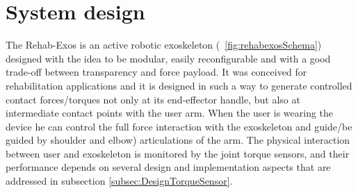 \section{System design} \label{sec:systemDesign}
\begin{figure*}[htb]
	\centering
	\def\svgwidth{2\columnwidth}
	\begin{footnotesize}
		
	\end{footnotesize}
	\caption{(a) The Rehab-Exos. It is a 5 DOF upper-limb exoskeleton  with 4 actuated joints. The joints $J_1$, $J_2$ and $J_4$ share the same characteristics: high reduction ratio (100:1) by means of harmonic drive, embedded torque sensor and maximum actuation torque of 150 \ Nm. The joint $J_3$ is composed by a semi-circular guide actuated by a DC motor through tendon transmission. Joint $J_5$ is passive and the exoskeleton is equipped of a force/torque sensor at the end-effector that is used for evaluation purposes. (b) A schematic representation of the Rehab-Exos exoskeleton. (c) CAD section of the $J_1$, $J_2$ and $J_4$ joint actuator of the Rehab-Exos. (d) Characteristic dimensions of the torque sensor.}
	\label{fig:rehabexosSchema}
\end{figure*}

The Rehab-Exos is an active robotic exoskeleton (\figurename \ \ref{fig:rehabexosSchema})  designed with the idea to be modular, easily reconfigurable and with a good trade-off between transparency and force payload.
It was conceived for rehabilitation applications and it is designed in such a way to generate controlled contact forces/torques not only at its end-effector handle, but also at  intermediate contact points with the user arm. When the user is wearing the device he can control the full force interaction with the exoskeleton and guide/be guided by shoulder and elbow) articulations of the arm. 
The physical interaction between user and exoskeleton is monitored by the joint torque sensors, and their performance depends on several design and implementation aspects that are addressed in subsection \ref{subsec:DesignTorqueSensor}.
